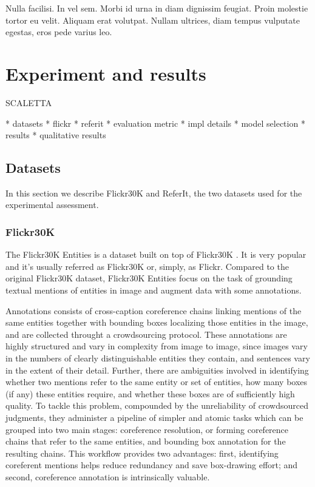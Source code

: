 \begin{savequote}[75mm]
Nulla facilisi. In vel sem. Morbi id urna in diam dignissim feugiat. Proin molestie tortor eu velit. Aliquam erat volutpat. Nullam ultrices, diam tempus vulputate egestas, eros pede varius leo.
\end{savequote}

\chapter{Experiment and results}

SCALETTA

* datasets
  * flickr
  * referit
* evaluation metric
* impl details
* model selection
* results
* qualitative results

\section{Datasets}

In this section we describe Flickr30K and ReferIt, the two datasets
used for the experimental assessment. 

\subsection{Flickr30K}

The Flickr30K Entities  is a dataset
built on top of Flickr30K . It is very popular and it's usually referred as Flickr30K or, simply, as Flickr. Compared to the original Flickr30K dataset, Flickr30K Entities focus on the task of grounding textual mentions of entities in image and augment data with some annotations.

Annotations consists of cross-caption coreference chains linking
mentions of the same entities together with bounding boxes localizing
those entities in the image, and are collected throught a
crowdsourcing protocol. These annotations are highly structured and
vary in complexity from image to image, since images vary in the
numbers of clearly distinguishable entities they contain, and
sentences vary in the extent of their detail. Further, there are
ambiguities involved in identifying whether two mentions refer to the
same entity or set of entities, how many boxes (if any) these entities
require, and whether these boxes are of sufficiently high quality. To
tackle this problem, compounded by the unreliability of crowdsourced
judgments, they administer a pipeline of simpler and atomic tasks
which can be grouped into two main stages: coreference resolution, or
forming coreference chains that refer to the same entities, and
bounding box annotation for the resulting chains. This workflow
provides two advantages: first, identifying coreferent mentions helps
reduce redundancy and save box-drawing effort; and second, coreference
annotation is intrinsically valuable.


